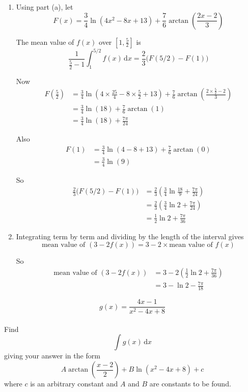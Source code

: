 \documentclass[leqno]{article}
\begin{document}
\begin{enumerate}[
  label=\textbf{\arabic*.},
  leftmargin=*,
  topsep=0pt,
  partopsep=0pt,
  parsep=0pt
]
\begin{djsSolution}
\begin{enumerate}[label=\textbf{(\alph*)}]
Therefore
\[
\int f(x)\,\mathrm{d}x
=\frac34\ln(4x^2-8x+13)+\frac76\arctan\left(\frac{2x-2}{3}\right)+c
\]

Therefore
\[
A=\frac34,\qquad B=\frac76
\]

  \item Using part (a), let
\[
F(x)=\frac34\ln(4x^2-8x+13)+\frac76\arctan\left(\frac{2x-2}{3}\right)
\]

The mean value of \(f(x)\) over \(\left[1,\frac52\right]\) is
\[
\frac{1}{\frac52-1}\int_1^{5/2} f(x)\,\mathrm{d}x
=\frac23\bigl(F(5/2)-F(1)\bigr)
\]

Now
\begin{align*}
F\left(\frac52\right)
&=\frac34\ln\left(4\times\frac{25}{4}-8\times\frac52+13\right)
+\frac76\arctan\left(\frac{2\times\frac52-2}{3}\right) \\
&=\frac34\ln(18)+\frac76\arctan(1) \\
&=\frac34\ln(18)+\frac{7\pi}{24}
\end{align*}

Also
\begin{align*}
F(1)
&=\frac34\ln(4-8+13)+\frac76\arctan(0) \\
&=\frac34\ln(9)
\end{align*}

So
\begin{align*}
\frac23\bigl(F(5/2)-F(1)\bigr)
&=\frac23\left(\frac34\ln\frac{18}{9}+\frac{7\pi}{24}\right) \\
&=\frac23\left(\frac34\ln 2+\frac{7\pi}{24}\right) \\
&=\frac12\ln 2+\frac{7\pi}{36}
\end{align*}

  \item Integrating term by term and dividing by the length of the interval gives
\[
\text{mean value of }(3-2f(x))
=3-2\times \text{mean value of }f(x)
\]

So
\begin{align*}
\text{mean value of }(3-2f(x))
&=3-2\left(\frac12\ln 2+\frac{7\pi}{36}\right) \\
&=3-\ln 2-\frac{7\pi}{18}
\end{align*}
\end{enumerate}
\end{djsSolution}


\newpage

\questionitem

\[
g(x)=\frac{4x-1}{x^2-4x+8}
\] \\
Find
\[
\int g(x)\,\mathrm{d}x
\]
giving your answer in the form
\[
A\arctan\left(\frac{x-2}{2}\right)+B\ln(x^2-4x+8)+c
\]
where $c$ is an arbitrary constant and $A$ and $B$ are constants to be found.  \\


\end{enumerate}
\end{document}
